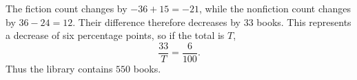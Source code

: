 The fiction count changes by $-36+15=-21$, while the nonfiction count changes by $36-24=12$. Their difference therefore decreases by $33$ books. This represents a decrease of six percentage points, so if the total is $T$,
\[
\dfrac{33}{T}=\dfrac{6}{100}.
\]
Thus the library contains $\boxed{550}$ books.
